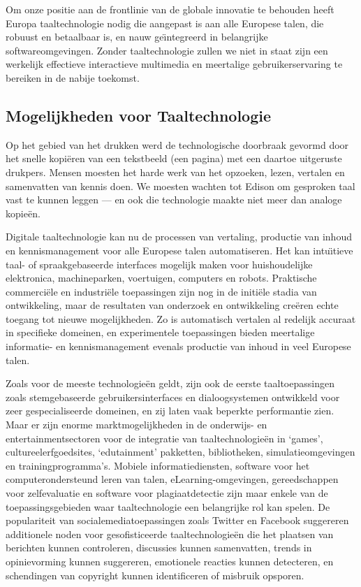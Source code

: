 \documentclass[]{../../metanetpaper}
\begin{document}
\begin{multicols}{2}

Om onze positie aan de frontlinie van de globale innovatie te behouden heeft Europa taaltechnologie nodig die aangepast is aan alle Europese talen, die robuust en betaalbaar is, en nauw ge{\"\i}ntegreerd in belangrijke softwareomgevingen. Zonder taaltechnologie zullen we niet in staat zijn een werkelijk effectieve interactieve multimedia en meertalige gebruikerservaring te bereiken in de nabije toekomst.

\subsection{Mogelijkheden voor Taaltechnologie}

    Op het gebied van het drukken werd de technologische doorbraak gevormd door het snelle kopi{\"e}ren van een tekstbeeld (een pagina) met een daartoe uitgeruste drukpers. Mensen moesten het harde werk van het opzoeken, lezen, vertalen en samenvatten van kennis doen. We moesten wachten tot Edison om gesproken taal vast te kunnen leggen --- en ook die technologie maakte niet meer dan analoge kopie{\"e}n.

    Digitale taaltechnologie kan nu de processen van vertaling, productie van inhoud en kennismanagement voor alle Europese talen automatiseren. Het kan intu{\"\i}tieve taal- of spraakgebaseerde interfaces mogelijk maken voor huishoudelijke elektronica, machineparken, voertuigen, computers en robots. Praktische commerci{\"e}le en industri{\"e}le toepassingen zijn nog in de initi{\"e}le stadia van ontwikkeling, maar de resultaten van onderzoek en ontwikkeling cre{\"e}ren echte toegang tot nieuwe mogelijkheden. Zo is automatisch vertalen al redelijk accuraat in specifieke domeinen, en experimentele toepassingen bieden meertalige informatie- en kennismanagement evenals productie van inhoud in veel Europese talen.

    Zoals voor de meeste technologie{\"e}n geldt, zijn ook de eerste taaltoepassingen zoals stemgebaseerde gebruikersinterfaces en dialoogsystemen ontwikkeld voor zeer gespecialiseerde domeinen, en zij laten vaak beperkte performantie zien. Maar er zijn enorme marktmogelijkheden in de onderwijs- en entertainmentsectoren voor de integratie van taaltechnologie{\"e}n in `games', cultureelerfgoedsites, `edutainment' pakketten, bibliotheken, simulatieomgevingen en trainingprogramma's. Mobiele informatiediensten, software voor het computerondersteund leren van talen, eLearning-omgevingen, gereedschappen voor zelfevaluatie en software voor plagiaatdetectie zijn maar enkele van de toepassingsgebieden waar taaltechnologie een belangrijke rol kan spelen. De populariteit van socialemediatoepassingen zoals Twitter en Facebook suggereren additionele noden voor gesofisticeerde taaltechnologie{\"e}n die het plaatsen van berichten kunnen controleren, discussies kunnen samenvatten, trends in opinievorming kunnen suggereren, emotionele reacties kunnen detecteren, en schendingen van copyright kunnen identificeren of misbruik opsporen.


\end{multicols}
\end{document}
